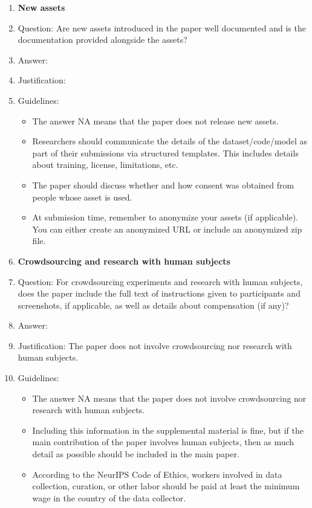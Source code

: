 \documentclass{article}
\theoremstyle{definition} \newtheorem{definition}{Definition}  \newtheorem{example}{Example}
\theoremstyle{remark} \newtheorem{remark}{Remark}
\newcounter{ct}
\begin{document}
\begin{enumerate}
\item {\bf New assets}
    \item[] Question: Are new assets introduced in the paper well documented and is the documentation provided alongside the assets?
    \item[] Answer: \answerTODO{} %
    \item[] Justification: \justificationTODO{}
    \item[] Guidelines:
    \begin{itemize}
        \item The answer NA means that the paper does not release new assets.
        \item Researchers should communicate the details of the dataset/code/model as part of their submissions via structured templates. This includes details about training, license, limitations, etc. 
        \item The paper should discuss whether and how consent was obtained from people whose asset is used.
        \item At submission time, remember to anonymize your assets (if applicable). You can either create an anonymized URL or include an anonymized zip file.
    \end{itemize}

\item {\bf Crowdsourcing and research with human subjects}
    \item[] Question: For crowdsourcing experiments and research with human subjects, does the paper include the full text of instructions given to participants and screenshots, if applicable, as well as details about compensation (if any)? 
    \item[] Answer: \answerNA{} %
    \item[] Justification: The paper does not involve crowdsourcing nor research with human subjects.
    \item[] Guidelines:
    \begin{itemize}
        \item The answer NA means that the paper does not involve crowdsourcing nor research with human subjects.
        \item Including this information in the supplemental material is fine, but if the main contribution of the paper involves human subjects, then as much detail as possible should be included in the main paper. 
        \item According to the NeurIPS Code of Ethics, workers involved in data collection, curation, or other labor should be paid at least the minimum wage in the country of the data collector. 
    \end{itemize}


\end{enumerate}
\end{document}
